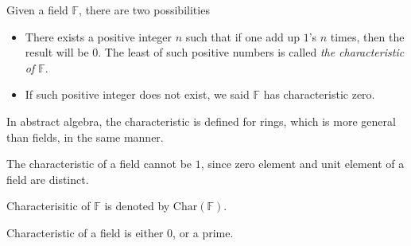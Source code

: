 \begin{definition}
    Given a field $\mathbb{F}$, there are two possibilities
    \begin{itemize}
        \item There exists a positive integer $n$ such that if one add up $1$'s $n$ times, then the result will be $0$. The least of such positive numbers is called \textit{the characteristic of $\mathbb{F}$}.
        \item If such positive integer does not exist, we said $\mathbb{F}$ has characteristic zero.
    \end{itemize}
\end{definition}

\begin{note}
    In abstract algebra, the characteristic is defined for rings, which is more general than fields, in the same manner.

    The characteristic of a field cannot be $1$, since zero element and unit element of a field are distinct.

    Characterisitic of $\mathbb{F}$ is denoted by $\text{Char}(\mathbb{F})$.
\end{note}

\begin{theorem}
    Characteristic of a field is either $0$, or a prime.
\end{theorem}

